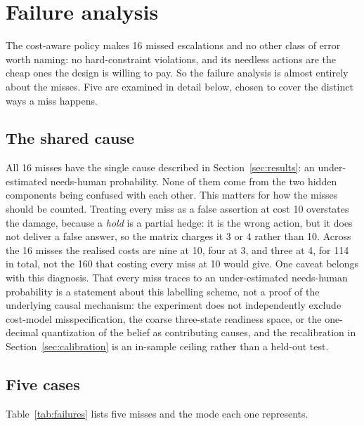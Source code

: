 \documentclass{article}
\begin{document}
\section{Failure analysis}
\label{sec:failure}

The cost-aware policy makes 16 missed escalations and no other class of error
worth naming: no hard-constraint violations, and its needless actions are the
cheap ones the design is willing to pay. So the failure analysis is almost
entirely about the misses. Five are examined in detail below, chosen to cover the
distinct ways a miss happens.

\subsection{The shared cause}
All 16 misses have the single cause described in Section~\ref{sec:results}: an
under-estimated needs-human probability. None of them come from the two hidden
components being confused with each other. This matters for how the misses should
be counted. Treating every miss as a false assertion at cost 10 overstates the
damage, because a \emph{hold} is a partial hedge: it is the wrong action, but it
does not deliver a false answer, so the matrix charges it 3 or 4 rather than 10.
Across the 16 misses the realised costs are nine at 10, four at 3, and three at 4,
for 114 in total, not the 160 that costing every miss at 10 would give.
One caveat belongs with this diagnosis. That every miss traces to an
under-estimated needs-human probability is a statement about this labelling
scheme, not a proof of the underlying causal mechanism: the experiment does not
independently exclude cost-model misspecification, the coarse three-state
readiness space, or the one-decimal quantization of the belief as contributing
causes, and the recalibration in Section~\ref{sec:calibration} is an in-sample
ceiling rather than a
held-out test.
\subsection{Five cases}
Table~\ref{tab:failures} lists five misses and the mode each one represents.
\end{document}
